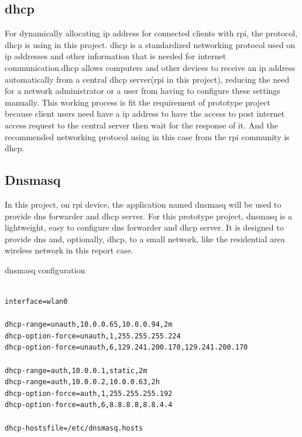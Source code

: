 \subsection{\gls{dhcp}}
\par For dynamically allocating \gls{ip} address for connected clients with \gls{rpi}, the protocol, \gls{dhcp} \cite{dhcp} is using in this project. \gls{dhcp} is a standardized networking protocol used on \gls{ip} addresses and other information that is needed for internet communication.\gls{dhcp} allows computers and other devices to receive an \gls{ip} address automatically from a central \gls{dhcp} server(\gls{rpi} in this project), reducing the need for a network administrator or a user from having to configure these settings manually. This working process is fit the requirement of prototype project because client users need have a \gls{ip} address to have the access to post internet access request to the central server then wait for the response of it. And the recommended networking protocol using in this case from the \gls{rpi} community is \gls{dhcp}.
\subsection{Dnsmasq}
\par In this project, on \gls{rpi} device, the application named dnsmasq \cite{dnsmasq} will be used to provide \gls{dns} forwarder and \gls{dhcp} server. For this prototype project, dnsmasq is a lightweight, easy to configure \gls{dns} forwarder and \gls{dhcp} server. It is designed to provide \gls{dns} and, optionally, \gls{dhcp}, to a small network, like the residential area wireless network in this report case.

\begin{algorithm}[h]
  \caption{dnsmasq configuration}
  \label{code:dnsmasq_config}
  \begin{verbatim}
  
interface=wlan0

dhcp-range=unauth,10.0.0.65,10.0.0.94,2m
dhcp-option-force=unauth,1,255.255.255.224
dhcp-option-force=unauth,6,129.241.200.170,129.241.200.170

dhcp-range=auth,10.0.0.1,static,2m
dhcp-range=auth,10.0.0.2,10.0.0.63,2h
dhcp-option-force=auth,1,255.255.255.192
dhcp-option-force=auth,6,8.8.8.8,8.8.4.4

dhcp-hostsfile=/etc/dnsmasq.hosts
 \end{verbatim}
\end{algorithm}

